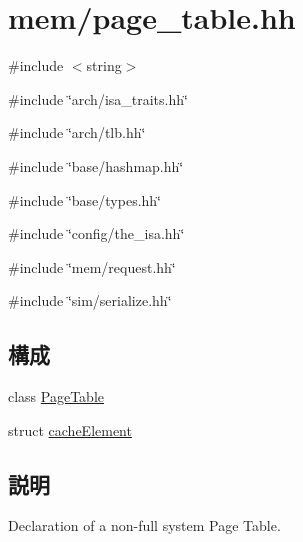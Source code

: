 \hypertarget{page__table_8hh}{
\section{mem/page\_\-table.hh}
\label{page__table_8hh}
}
{\ttfamily \#include $<$string$>$}\par
{\ttfamily \#include \char`\"{}arch/isa\_\-traits.hh\char`\"{}}\par
{\ttfamily \#include \char`\"{}arch/tlb.hh\char`\"{}}\par
{\ttfamily \#include \char`\"{}base/hashmap.hh\char`\"{}}\par
{\ttfamily \#include \char`\"{}base/types.hh\char`\"{}}\par
{\ttfamily \#include \char`\"{}config/the\_\-isa.hh\char`\"{}}\par
{\ttfamily \#include \char`\"{}mem/request.hh\char`\"{}}\par
{\ttfamily \#include \char`\"{}sim/serialize.hh\char`\"{}}\par
\subsection*{構成}
\begin{DoxyCompactItemize}
\item 
class \hyperlink{classPageTable}{PageTable}
\item 
struct \hyperlink{structPageTable_1_1cacheElement}{cacheElement}
\end{DoxyCompactItemize}


\subsection{説明}
Declaration of a non-\/full system Page Table. 